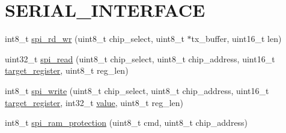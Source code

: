 \hypertarget{a00007}{\section{S\-E\-R\-I\-A\-L\-\_\-\-I\-N\-T\-E\-R\-F\-A\-C\-E}
\label{de/d5e/a00007}
}








  


\begin{DoxyCompactItemize}
\item 
int8\-\_\-t \hyperlink{a00007_gadd297682b87478aed2d07f4f536353c1}{spi\-\_\-rd\-\_\-wr} (uint8\-\_\-t chip\-\_\-select, uint8\-\_\-t $\ast$tx\-\_\-buffer, uint16\-\_\-t len)
\begin{DoxyCompactList}\small\item\em 

 \end{DoxyCompactList}\end{DoxyCompactItemize}
\begin{DoxyCompactItemize}
\item 
uint32\-\_\-t \hyperlink{a00007_ga7ad9f65ee46aca507374096506a0b1c4}{spi\-\_\-read} (uint8\-\_\-t chip\-\_\-select, uint8\-\_\-t chip\-\_\-address, uint16\-\_\-t \hyperlink{a00041_ac02048009fa6718e40f028b6bae63f3d}{target\-\_\-register}, uint8\-\_\-t reg\-\_\-len)
\begin{DoxyCompactList}\small\item\em 

 \end{DoxyCompactList}\end{DoxyCompactItemize}
\begin{DoxyCompactItemize}
\item 
int8\-\_\-t \hyperlink{a00007_ga2770219ad8ad1eda1817c0df934b47d0}{spi\-\_\-write} (uint8\-\_\-t chip\-\_\-select, uint8\-\_\-t chip\-\_\-address, uint16\-\_\-t \hyperlink{a00041_ac02048009fa6718e40f028b6bae63f3d}{target\-\_\-register}, int32\-\_\-t \hyperlink{a00041_a638e4503e0ae6ce655b7ad2e17e8f0ad}{value}, uint8\-\_\-t reg\-\_\-len)
\end{DoxyCompactItemize}
\begin{DoxyCompactItemize}
\item 
int8\-\_\-t \hyperlink{a00007_gae51aa618efe7af5f3a68ac324f2a7840}{spi\-\_\-ram\-\_\-protection} (uint8\-\_\-t cmd, uint8\-\_\-t chip\-\_\-address)
\begin{DoxyCompactList}\small\item\em 

 \end{DoxyCompactList}\end{DoxyCompactItemize}


